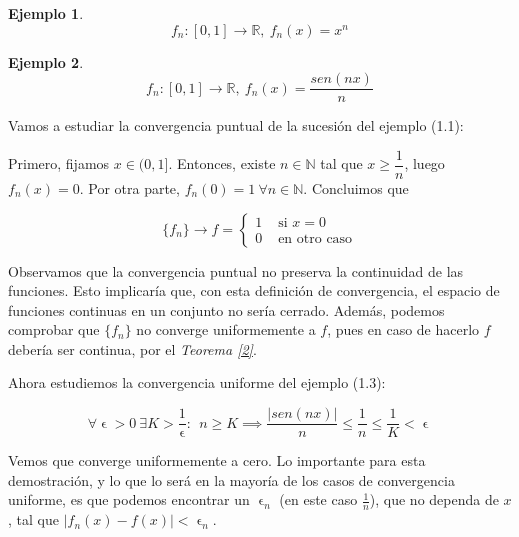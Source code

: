 \documentclass[11pt, a4paper]{article}
\let\epsilon\upvarepsilon
\providecommand{\abs}[1]{\lvert#1\rvert}
\newcommand{\R}{\mathbb{R}}
\newcommand{\N}{\mathbb{N}}
\newcommand{\fn}{\{f_n\}}
\theoremstyle{theorem-style}
\theoremstyle{definition-style}
\theoremstyle{remark-style}
\theoremstyle{example-style}
\newtheorem{ejemplo}{Ejemplo}[section]
\begin{document}
\begin{ejemplo}
  \[
    f_n : [0,1] \to \R,\ f_n(x) = x^n
  \]
\end{ejemplo}

\begin{ejemplo}
  \[
    f_n : [0,1] \to \R,\ f_n(x) = \dfrac{sen(nx)}{n}
  \]
\end{ejemplo}


Vamos a estudiar la convergencia puntual de la sucesión del ejemplo (1.1):

Primero, fijamos $x\in (0,1]$. Entonces, existe $n\in \N$ tal que $x \ge \dfrac{1}{n}$, luego $f_n(x) = 0$. Por otra parte, $f_n(0) = 1\ \forall n\in \N$. Concluimos que

\[
  \fn\to f = \begin{cases}
    1 & \text{ si } x=0\\
    0 & \text{ en otro caso}
  \end{cases}
\]

Observamos que la convergencia puntual no preserva la continuidad de las funciones. Esto implicaría que, con esta definición de convergencia, el espacio de funciones continuas en un conjunto no sería cerrado. Además, podemos comprobar que $\fn$ no converge uniformemente a $f$, pues en caso de hacerlo $f$ debería ser continua, por el \textit{Teorema \ref{2}}.

Ahora estudiemos la convergencia uniforme del ejemplo (1.3):

\[
  \forall\epsilon>0\ \exists K>\dfrac{1}{\epsilon}:\ \ n\ge K \implies \dfrac{\abs{sen(nx)}}{n} \le \dfrac{1}{n} \le \dfrac{1}{K} < \epsilon
\]

Vemos que converge uniformemente a cero. Lo importante para esta demostración, y lo que lo será en la mayoría de los casos de convergencia uniforme, es que podemos encontrar un $\epsilon_n$ (en este caso $\frac{1}{n}$), que no dependa de $x$, tal que $\abs{f_n(x)-f(x)} < \epsilon_n$.
\end{document}
